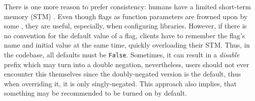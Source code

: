 There is one more reason to prefer consistency: humans have a limited short-term memory (STM) \cite{miller1956magical}. Even though flags as function parameters are frowned upon by some \cite{martin2009clean}, they are useful, especially, when configuring libraries. However, if there is no convention for the default value of a flag, clients have to remember the flag's name and initial value at the same time, quickly overloading their STM. Thus, in the codebase, all defaults must be \texttt{False}. Sometimes, it can result in a \textit{disable} prefix which may turn into a double negation, nevertheless, users should not ever encounter this themselves since the doubly-negated version is the default, thus when overriding it, it is only singly-negated. This approach also implies, that something may be recommended to be turned on by default.
